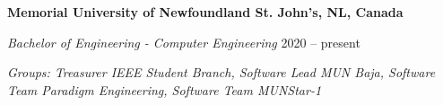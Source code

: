 \textbf{Memorial University of Newfoundland \hfill St. John's, NL, Canada} \par
\textit{Bachelor of Engineering - Computer Engineering} \hfill 2020 -- present\par
\textit{Groups: Treasurer IEEE Student Branch, Software Lead MUN Baja, Software Team Paradigm Engineering, Software Team MUNStar-1}